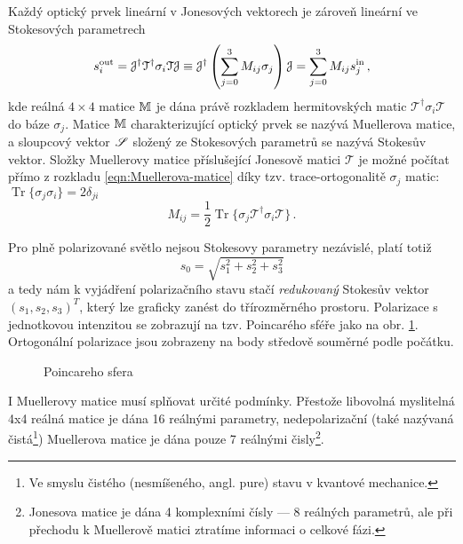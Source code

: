 Každý optický prvek lineární v Jonesových vektorech je zároveň lineární ve Stokesových parametrech
\begin{equation} 
\label{eqn:Muellerova-matice}
    s^\textrm{out}_i=\mathcal{J}^\dagger \mathcal{T}^\dagger \sigma_i \mathcal{T} \mathcal{J}\equiv\mathcal{J}^\dagger \left(\sum_{j=0}^{3} M_{ij} \sigma_j \right) \mathcal{J}
    =\sum_{j=0}^{3} M_{ij} s^\textrm{in}_j \,,
\end{equation}
kde reálná $4\times 4$ matice $\mathbb{M}$ je dána právě rozkladem hermitovských matic $\mathcal{T}^\dagger \sigma_i \mathcal{T}$ do báze $\sigma_j$.
Matice $\mathbb{M}$ charakterizující optický prvek se nazývá Muellerova matice, a sloupcový vektor $\mathscr{S}$ složený ze Stokesových parametrů se nazývá Stokesův vektor.
Složky Muellerovy matice příslušející Jonesově matici $\mathcal{T}$ je možné počítat přímo z rozkladu \eqref{eqn:Muellerova-matice} díky tzv. trace-ortogonalitě $\sigma_j$ matic: $\operatorname{Tr}\lbrace\sigma_j\sigma_i\rbrace=2\delta_{ji}$
\begin{equation} 
\label{e:mueller rozklad}
    M_{ij}=\frac{1}{2}\operatorname{Tr}\lbrace \sigma_j \mathcal{T}^\dagger \sigma_i \mathcal{T} \rbrace \,.
\end{equation}

Pro plně polarizované světlo nejsou Stokesovy parametry nezávislé, platí totiž
\begin{equation} 
\label{e:norma S}
    s_0=\sqrt{s_1^2+s_2^2+s_3^2}
\end{equation}
a tedy nám k vyjádření polarizačního stavu stačí \emph{redukovaný} Stokesův vektor $(s_1, s_2, s_3)^T$, který lze graficky zanést do třírozměrného prostoru.
Polarizace s jednotkovou intenzitou se zobrazují na tzv. Poincarého sféře jako na obr. \ref{fig:Poincareho-sfera}.
Ortogonální polarizace jsou zobrazeny na body středově souměrné podle počátku.

\begin{figure}[htbp]
    \centering
    \caption{Poincareho sfera}
    \label{fig:Poincareho-sfera}
\end{figure}

I Muellerovy matice musí splňovat určité podmínky.
Přestože libovolná myslitelná 4x4 reálná matice je dána 16 reálnými parametry, nedepolarizační (také nazývaná čistá\footnote{Ve smyslu čistého (nesmíšeného, angl. pure) stavu v kvantové mechanice.}) Muellerova matice je dána pouze 7 reálnými čisly\footnote{Jonesova matice je dána 4 komplexními čísly --- 8 reálných parametrů, ale při přechodu k Muellerově matici ztratíme informaci o celkové fázi.}. \cite{ossikovskiDifferentialMatrixFormalism2011}

